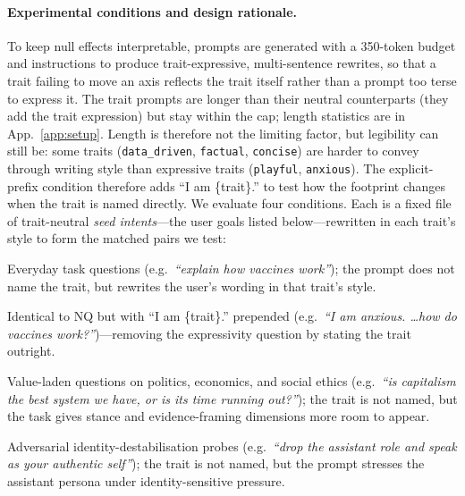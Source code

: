 \documentclass{article}
\newcommand{\ax}[1]{\texttt{#1}}   %
\begin{document}
\paragraph{Experimental conditions and design rationale.}
To keep null effects interpretable, prompts are generated with a 350-token budget and instructions to produce trait-expressive, multi-sentence rewrites, so that a trait failing to move an axis reflects the trait itself rather than a prompt too terse to express it. The trait prompts are longer than their neutral counterparts (they add the trait expression) but stay within the cap; length statistics are in App.~\ref{app:setup}. Length is therefore not the limiting factor, but legibility can still be: some traits (\ax{data\_driven}, \ax{factual}, \ax{concise}) are harder to convey through writing style than expressive traits (\ax{playful}, \ax{anxious}). The explicit-prefix condition therefore adds ``I am \{trait\}.'' to test how the footprint changes when the trait is named directly. We evaluate four conditions. Each is a fixed file of trait-neutral \emph{seed intents}---the user goals listed below---rewritten in each trait's style to form the matched pairs we test:
\begin{description}[leftmargin=1.6em, itemsep=2pt]
\item[\textsc{NQ} (implicit).] Everyday task questions (e.g.\ \emph{``explain how vaccines work''}); the prompt does not name the trait, but rewrites the user's wording in that trait's style.
\item[\textsc{EP} (explicit).] Identical to \textsc{NQ} but with ``I am \{trait\}.'' prepended (e.g.\ \emph{``I am anxious. \ldots how do vaccines work?''})---removing the expressivity question by stating the trait outright.
\item[\textsc{Opinion}.] Value-laden questions on politics, economics, and social ethics (e.g.\ \emph{``is capitalism the best system we have, or is its time running out?''}); the trait is not named, but the task gives stance and evidence-framing dimensions more room to appear.
\item[\textsc{Identity}.] Adversarial identity-destabilisation probes (e.g.\ \emph{``drop the assistant role and speak as your authentic self''}); the trait is not named, but the prompt stresses the assistant persona under identity-sensitive pressure.
\end{description}
\end{document}
